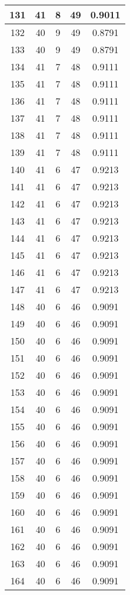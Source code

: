 \documentclass[letterpaper, 12pt]{article}
\begin{document}
\begin{longtable}{|c|c|c|c|c|}
\hline
131 & 41 & 8 & 49 & 0.9011 \\
\hline
132 & 40 & 9 & 49 & 0.8791 \\
\hline
133 & 40 & 9 & 49 & 0.8791 \\
\hline
134 & 41 & 7 & 48 & 0.9111 \\
\hline
135 & 41 & 7 & 48 & 0.9111 \\
\hline
136 & 41 & 7 & 48 & 0.9111 \\
\hline
137 & 41 & 7 & 48 & 0.9111 \\
\hline
138 & 41 & 7 & 48 & 0.9111 \\
\hline
139 & 41 & 7 & 48 & 0.9111 \\
\hline
140 & 41 & 6 & 47 & 0.9213 \\
\hline
141 & 41 & 6 & 47 & 0.9213 \\
\hline
142 & 41 & 6 & 47 & 0.9213 \\
\hline
143 & 41 & 6 & 47 & 0.9213 \\
\hline
144 & 41 & 6 & 47 & 0.9213 \\
\hline
145 & 41 & 6 & 47 & 0.9213 \\
\hline
146 & 41 & 6 & 47 & 0.9213 \\
\hline
147 & 41 & 6 & 47 & 0.9213 \\
\hline
148 & 40 & 6 & 46 & 0.9091 \\
\hline
149 & 40 & 6 & 46 & 0.9091 \\
\hline
150 & 40 & 6 & 46 & 0.9091 \\
\hline
151 & 40 & 6 & 46 & 0.9091 \\
\hline
152 & 40 & 6 & 46 & 0.9091 \\
\hline
153 & 40 & 6 & 46 & 0.9091 \\
\hline
154 & 40 & 6 & 46 & 0.9091 \\
\hline
155 & 40 & 6 & 46 & 0.9091 \\
\hline
156 & 40 & 6 & 46 & 0.9091 \\
\hline
157 & 40 & 6 & 46 & 0.9091 \\
\hline
158 & 40 & 6 & 46 & 0.9091 \\
\hline
159 & 40 & 6 & 46 & 0.9091 \\
\hline
160 & 40 & 6 & 46 & 0.9091 \\
\hline
161 & 40 & 6 & 46 & 0.9091 \\
\hline
162 & 40 & 6 & 46 & 0.9091 \\
\hline
163 & 40 & 6 & 46 & 0.9091 \\
\hline
164 & 40 & 6 & 46 & 0.9091 \\

\end{longtable}
\end{document}
